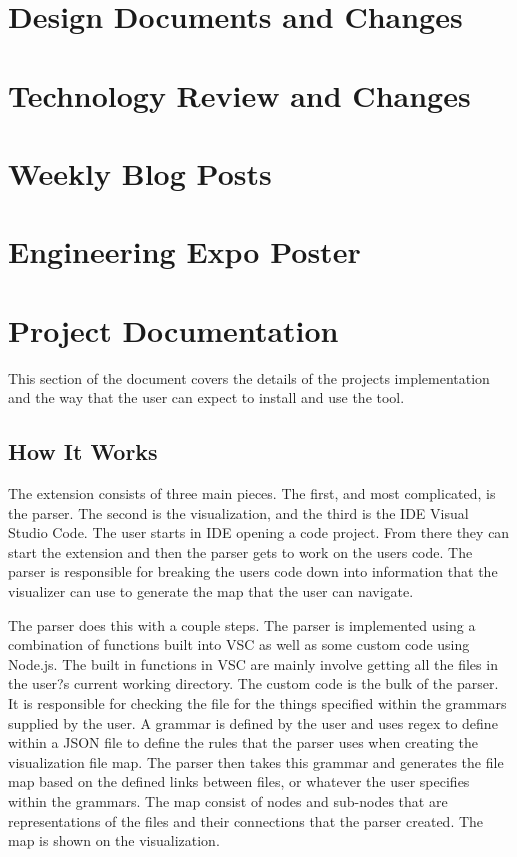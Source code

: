 \documentclass[letterpaper,10pt,titlepage,draftclsnofoot,onecolumn,onesided] {IEEEtran}
\begin{document}
\section{Design Documents and Changes}

\section{Technology Review and Changes}

\section{Weekly Blog Posts}
		
		
	

\section{Engineering Expo Poster}

\section{Project Documentation}
This section of the document covers the details of the projects implementation and the way that the user can expect to install and use the tool.

\subsection{How It Works}
The extension consists of three main pieces. The first, and most complicated, is the parser. The second is the visualization, and the third is the IDE Visual Studio Code.
The user starts in IDE opening a code project. 
From there they can start the extension and then the parser gets to work on the users code. 
The parser is responsible for breaking the users code down into information that the visualizer can use to generate the map that the user can navigate. 

The parser does this with a couple steps. 
The parser is implemented using a combination of functions built into VSC as well as some custom code using Node.js. 
The built in functions in VSC are mainly involve getting all the files in the user?s current working directory. 
The custom code is the bulk of the parser.
It is responsible for checking the file for the things specified within the grammars supplied by the user. 
A grammar is defined by the user and uses regex to define within a JSON file to define the rules that the parser uses when creating the visualization file map. 
The parser then takes this grammar and generates the file map based on the defined links between files, or whatever the user specifies within the grammars.
The map consist of nodes and sub-nodes that are representations of the files and their connections that the parser created.
The map is shown on the visualization. \\
\end{document}
